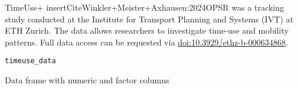 \documentclass[letterpaper]{book}
\begin{document}
%
\begin{Description}
TimeUse+ \bsl{}insertCiteWinkler+Meister+Axhausen:2024OPSR was a tracking study
conducted at the Institute for Transport Planning and Systems (IVT) at ETH Zurich.
The data allows researchers to investigate time-use and mobility patterns.
Full data access can be requested via \url{doi:10.3929/ethz-b-000634868}.
\end{Description}
%
\begin{Usage}
\begin{verbatim}
timeuse_data
\end{verbatim}
\end{Usage}
%
\begin{Format}
Data frame with numeric and factor columns
\begin{description}


\end{description}
\end{Format}
\end{document}
